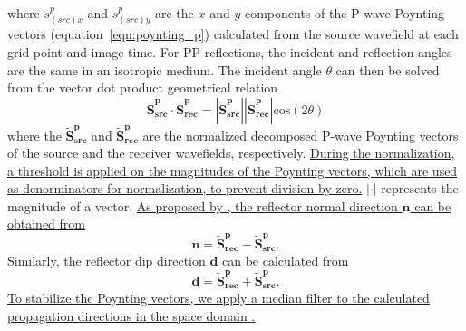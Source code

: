 \documentclass[manuscript,ulem,graphix,revised]{geophysics}
\begin{document}
where $s^{p}_{(src)x}$ and $s^{p}_{(src)y}$ are the $x$ and $y$ components of the P-wave Poynting vectors (equation~\ref{eqn:poynting_p}) calculated from the source wavefield at each grid point and image time. For PP reflections, the incident and reflection angles are the same in an isotropic medium. The incident angle $\theta$ can then be solved from the vector dot product geometrical relation \citep{du17,shabelansky17,zhu17}
\begin{equation}
\mathbf{\tilde{S}^{p}_{src}}\cdot \mathbf{\tilde{S}^p_{rec}}=|\mathbf{\tilde{S}^{p}_{src}}||\mathbf{\tilde{S}^p_{rec}}|\mathrm{cos}(2\theta)
\label{eqn:inc_agl}
\end{equation}
where the $\mathbf{\tilde{S}^{p}_{src}}$ and $\mathbf{\tilde{S}^p_{rec}}$ are the normalized decomposed P-wave Poynting vectors of the source and the receiver wavefields, respectively. \marginnote{[]} \uline{During the normalization, a threshold is applied on the magnitudes of the Poynting vectors, which are used as denorminators for normalization, to prevent division by zero.}  $|\cdot|$ represents the magnitude of a vector. \marginnote{[4]}\uline{As proposed by \mbox{\citet{du14}}, the reflector normal direction $\mathbf{n}$ can be obtained from}
\begin{equation}
\mathbf{n}=\mathbf{\tilde{S}^p_{rec}}-\mathbf{\tilde{S}^{p}_{src}}.
\end{equation}
Similarly, the reflector dip direction $\mathbf{d}$ can be calculated from
\begin{equation}
\mathbf{d}=\mathbf{\tilde{S}^p_{rec}}+\mathbf{\tilde{S}^{p}_{src}}.
\end{equation}
\marginnote{[5]}\uline{To stabilize the Poynting vectors, we apply a median filter to the calculated propagation directions in the space domain \mbox{\citep{jin14}}.}
 
\end{document}
